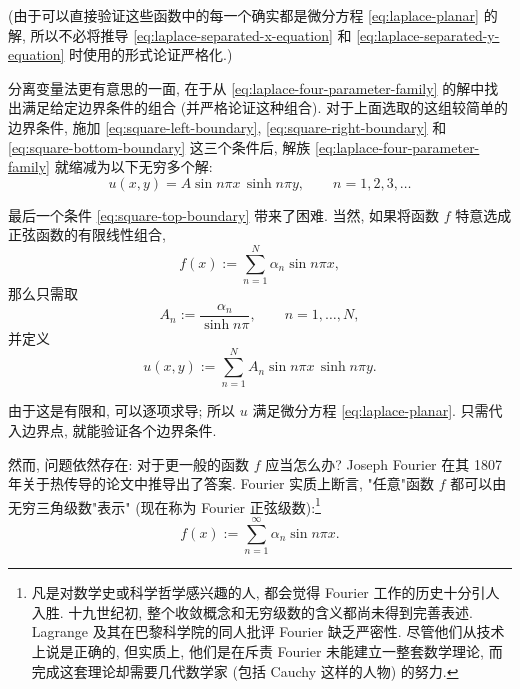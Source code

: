 (由于可以直接验证这些函数中的每一个确实都是微分方程 \eqref{eq:laplace-planar} 的解, 所以不必将推导 \eqref{eq:laplace-separated-x-equation} 和 \eqref{eq:laplace-separated-y-equation} 时使用的形式论证严格化.)

分离变量法更有意思的一面, 在于从 \eqref{eq:laplace-four-parameter-family} 的解中找出满足给定边界条件的组合 (并严格论证这种组合). 对于上面选取的这组较简单的边界条件, 施加 \eqref{eq:square-left-boundary}, \eqref{eq:square-right-boundary} 和 \eqref{eq:square-bottom-boundary} 这三个条件后, 解族 \eqref{eq:laplace-four-parameter-family} 就缩减为以下无穷多个解:
\begin{equation}\label{eq:square-three-boundary-modes}
u(x,y)=A\sin n\pi x\,\sinh n\pi y,\qquad n=1,2,3,\ldots
\end{equation}


最后一个条件 \eqref{eq:square-top-boundary} 带来了困难. 当然, 如果将函数 $f$ 特意选成正弦函数的有限线性组合,
\begin{equation}\label{eq:finite-sine-boundary-data}
f(x):=\sum_{n=1}^N\alpha_n\sin n\pi x,
\end{equation}
那么只需取
\begin{equation}\label{eq:finite-sine-solution-coefficients}
A_n:=\dfrac{\alpha_n}{\sinh n\pi},\qquad n=1,\ldots,N,
\end{equation}
并定义
\begin{equation}\label{eq:finite-sine-square-solution}
u(x,y):=\sum_{n=1}^NA_n\sin n\pi x\,\sinh n\pi y.
\end{equation}


由于这是有限和, 可以逐项求导; 所以 $u$ 满足微分方程 \eqref{eq:laplace-planar}. 只需代入边界点, 就能验证各个边界条件.

然而, 问题依然存在: 对于更一般的函数 $f$ 应当怎么办? Joseph Fourier 在其 1807 年关于热传导的论文中推导出了答案. Fourier 实质上断言, "任意"函数 $f$ 都可以由无穷三角级数"表示" (现在称为 Fourier 正弦级数):\footnote{凡是对数学史或科学哲学感兴趣的人, 都会觉得 Fourier 工作的历史十分引人入胜. 十九世纪初, 整个收敛概念和无穷级数的含义都尚未得到完善表述. Lagrange 及其在巴黎科学院的同人批评 Fourier 缺乏严密性. 尽管他们从技术上说是正确的, 但实质上, 他们是在斥责 Fourier 未能建立一整套数学理论, 而完成这套理论却需要几代数学家 (包括 Cauchy 这样的人物) 的努力.}
\begin{equation}\label{eq:fourier-sine-series}
f(x):=\sum_{n=1}^{\infty}\alpha_n\sin n\pi x.
\end{equation}


